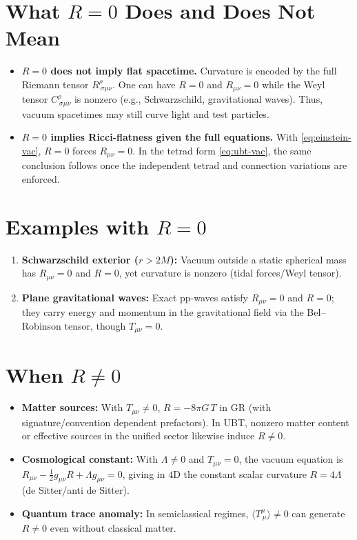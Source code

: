 \documentclass[12pt]{article}
\begin{document}
\section{What $R=0$ Does and Does Not Mean}
\begin{itemize}[leftmargin=2em]
\item \textbf{$R=0$ does not imply flat spacetime.} Curvature is encoded by the full Riemann tensor $R^\rho_{\ \sigma\mu\nu}$. One can have $R=0$ and $R_{\mu\nu}=0$ while the Weyl tensor $C^\rho_{\ \sigma\mu\nu}$ is nonzero (e.g., Schwarzschild, gravitational waves). Thus, vacuum spacetimes may still curve light and test particles.
\item \textbf{$R=0$ implies Ricci-flatness given the full equations.} With \eqref{eq:einstein-vac}, $R=0$ forces $R_{\mu\nu}=0$. In the tetrad form \eqref{eq:ubt-vac}, the same conclusion follows once the independent tetrad and connection variations are enforced.
\end{itemize}

\section{Examples with $R=0$}
\begin{enumerate}[leftmargin=2em]
\item \textbf{Schwarzschild exterior ($r>2M$):} Vacuum outside a static spherical mass has $R_{\mu\nu}=0$ and $R=0$, yet curvature is nonzero (tidal forces/Weyl tensor).
\item \textbf{Plane gravitational waves:} Exact pp-waves satisfy $R_{\mu\nu}=0$ and $R=0$; they carry energy and momentum in the gravitational field via the Bel--Robinson tensor, though $T_{\mu\nu}=0$.
\end{enumerate}

\section{When $R\neq 0$}
\begin{itemize}[leftmargin=2em]
\item \textbf{Matter sources:} With $T_{\mu\nu}\neq 0$,
\(
R = -8\pi G\, T
\)
in GR (with signature/convention dependent prefactors). In UBT, nonzero matter content or effective sources in the unified sector likewise induce $R\neq 0$.
\item \textbf{Cosmological constant:} With $\Lambda\neq 0$ and $T_{\mu\nu}=0$, the vacuum equation is $R_{\mu\nu} - \tfrac{1}{2}g_{\mu\nu}R + \Lambda g_{\mu\nu}=0$, giving in $4$D the constant scalar curvature $R=4\Lambda$ (de Sitter/anti de Sitter).
\item \textbf{Quantum trace anomaly:} In semiclassical regimes, $\langle T^\mu_{\ \mu}\rangle\neq 0$ can generate $R\neq 0$ even without classical matter.
\end{itemize}
\end{document}
